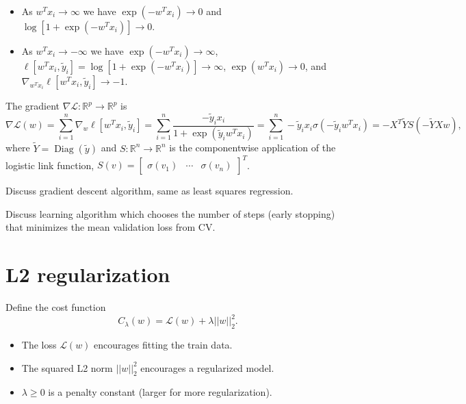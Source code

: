 \documentclass{article}
\DeclareMathOperator*{\Diag}{Diag}
\begin{document}
\begin{itemize}
\item As $w^T x_i\rightarrow \infty$ we have
  $\exp(-w^T x_i)\rightarrow 0$ and
  $\log [1+\exp(- w^T x_i)]\rightarrow 0$.
\item As $w^T x_i\rightarrow -\infty$ we have
  $\exp(-w^T x_i)\rightarrow \infty$,
  $\ell[w^T x_i, \tilde y_i] = \log [1+\exp(- w^T x_i)]\rightarrow \infty$,
  $\exp(w^T x_i)\rightarrow 0$, and $\nabla_{w^T x_i} \ell[w^T x_i, \tilde y_i] \rightarrow -1$.
\end{itemize}


The gradient $\nabla\mathcal L:\mathbb R^p\rightarrow\mathbb R^p$ is
\begin{equation*}
\nabla \mathcal L(w) = \sum_{i=1}^n \nabla_w \ell[w^T x_i, \tilde y_i] = 
\sum_{i=1}^n \frac{
  -\tilde y_i x_i
}{
  1+\exp(\tilde y_i w^T x_i)
} = 
\sum_{i=1}^n-\tilde y_i x_i \sigma(-\tilde y_i w^T x_i) = -X^T \tilde Y S(-\tilde Y X w),
\end{equation*}
where $\tilde Y=\Diag(\tilde y)$ and $S:\mathbb R^n\rightarrow \mathbb R^n$ is the componentwise application
of the logistic link function,
$S(v) = \left[
    \begin{array}{ccc}
      \sigma(v_1) & \cdots & \sigma(v_n)
    \end{array}
\right]^T$.

Discuss gradient descent algorithm, same as least squares regression.

Discuss learning algorithm which chooses the number of steps (early
stopping) that minimizes the mean validation loss from CV.

\section{L2 regularization}

Define the cost function
\begin{equation}
  \label{eq:cost}
  C_\lambda(w) = \mathcal L(w) + \lambda||w||_2^2.
\end{equation}
\begin{itemize}
\item The loss $\mathcal L(w)$  encourages fitting the train data.
\item The squared L2 norm $||w||_2^2$ encourages a regularized model.
\item $\lambda\geq 0$ is a penalty constant (larger for more regularization).
\end{itemize}
\end{document}

